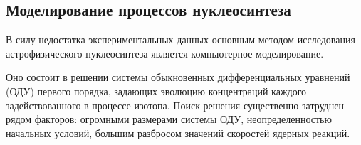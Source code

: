 \subsection{Моделирование процессов нуклеосинтеза}
В силу недостатка экспериментальных данных основным методом исследования астрофизического нуклеосинтеза является компьютерное моделирование. 


Оно состоит в решении системы обыкновенных дифференциальных уравнений (ОДУ) первого порядка, задающих эволюцию концентраций каждого задействованного в процессе изотопа. Поиск решения существенно затруднен рядом факторов: огромными размерами системы ОДУ, неопределенностью начальных условий, большим разбросом значений скоростей ядерных реакций.

